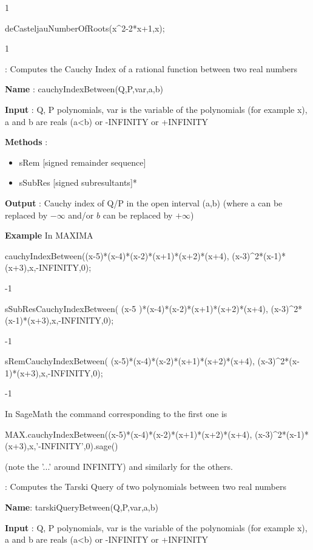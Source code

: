 \documentclass{article}
\begin{document}
{ 1
    
  deCasteljauNumberOfRoots(x\^{}2-2*x+1,x);
  
  1
  


:
  Computes the Cauchy Index of a rational function between two real numbers
  
 {\bf Name} : cauchyIndexBetween(Q,P,var,a,b)
  
  {\bf Input} : Q, P polynomials, var is the variable of the polynomials (for example x), a and b are reals (a<b) or -INFINITY or +INFINITY
  
  {\bf  Methods} :
  \begin{itemize}
    \item sRem [signed remainder sequence]
    \item sSubRes [signed subresultants]*
  \end{itemize}
  
   {\bf Output} : Cauchy index of Q/P in the open  interval (a,b) (where a can be replaced by $-\infty$ and/or $b$ can be replaced by $+\infty$)
  
  {\bf Example} In MAXIMA
  
  cauchyIndexBetween((x-5)*(x-4)*(x-2)*(x+1)*(x+2)*(x+4),
    (x-3)\^{}2*(x-1)*(x+3),x,-INFINITY,0);
    
    -1
    
    sSubResCauchyIndexBetween(
    (x-5 )*(x-4)*(x-2)*(x+1)*(x+2)*(x+4),
    (x-3)\^{}2*(x-1)*(x+3),x,-INFINITY,0);
    
    -1
    
    sRemCauchyIndexBetween(
    (x-5)*(x-4)*(x-2)*(x+1)*(x+2)*(x+4),
    (x-3)\^{}2*(x-1)*(x+3),x,-INFINITY,0);
    
    -1
    
    \noindent In SageMath the command corresponding to the first one is

  MAX.cauchyIndexBetween((x-5)*(x-4)*(x-2)*(x+1)*(x+2)*(x+4),
    (x-3)\^{}2*(x-1)*(x+3),x,'-INFINITY',0).sage()    
    
    \noindent (note the '...' around INFINITY) and similarly for the others.

:
  Computes the Tarski Query of two polynomials between two real numbers

{\bf Name}: tarskiQueryBetween(Q,P,var,a,b)
  
{\bf Input} : Q, P polynomials, var is the variable of the polynomials (for example x), a and b are reals (a<b) or -INFINITY or +INFINITY
  
}
\end{document}
